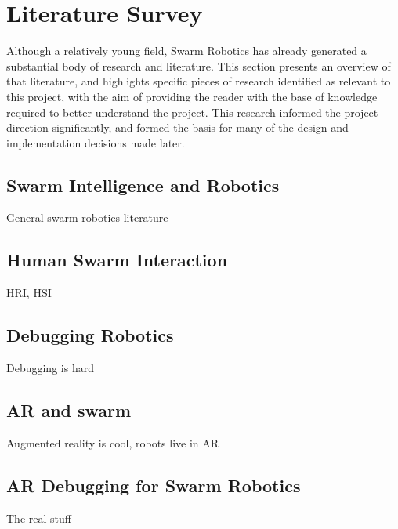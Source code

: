 
\chapter[Literature Survey]{Literature Survey} %

\label{Chapter2} %





Although a relatively young field, Swarm Robotics has already generated a substantial body of research and literature. This section presents an overview of that literature, and highlights specific pieces of research identified as relevant to this project, with the aim of providing the reader with the base of knowledge required to better understand the project. This research informed the project direction significantly, and formed the basis for many of the design and implementation decisions made later. 


\section{Swarm Intelligence and Robotics}
General swarm robotics literature


\section{Human Swarm Interaction}
HRI, HSI


\section{Debugging Robotics}
Debugging is hard


\section{AR and swarm}
Augmented reality is cool, robots live in AR

\section{AR Debugging for Swarm Robotics}
The real stuff
